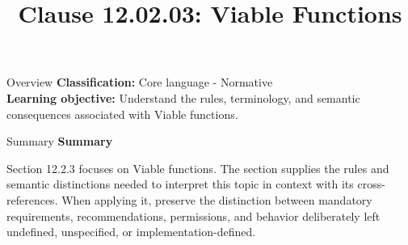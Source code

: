 \documentclass[10pt,letterpaper]{article}
\title{Clause 12.02.03: Viable Functions}
\author{}
\date{}
\begin{document}
\maketitle
\begin{CornellOverviewBox}{Overview}
\textbf{Classification:} Core language - Normative\\[2pt]
\textbf{Learning objective:} Understand the rules, terminology, and semantic consequences associated with Viable functions.
\end{CornellOverviewBox}\begin{CornellSummaryBox}{Summary}
{\sffamily\bfseries\color{Accent} Summary}\par\vspace{3pt}Section 12.2.3 focuses on Viable functions. The section supplies the rules and semantic distinctions needed to interpret this topic in context with its cross-references. When applying it, preserve the distinction between mandatory requirements, recommendations, permissions, and behavior deliberately left undefined, unspecified, or implementation-defined.
\end{CornellSummaryBox}
\end{document}
